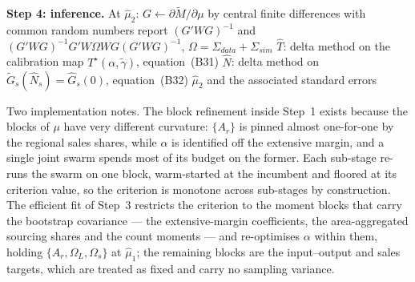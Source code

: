 \begin{algorithm}[H]
\begin{algorithmic}[1]
\vspace{3pt}
\State \textbf{Step 4: inference.} At $\widehat{\mu}_2$:
\State \quad $G\gets\partial\widetilde{M}/\partial\mu$ by central finite
  differences with common random numbers
\State \quad report $(G'WG)^{-1}$ and
  $(G'WG)^{-1}G'W\Omega WG(G'WG)^{-1}$, $\Omega=\Sigma_{data}+\Sigma_{sim}$
\State \quad $\widehat{T}$: delta method on the calibration map
  $T^\star(\alpha,\widetilde{\gamma})$, equation~(B31)
\State \quad $\widehat{N}$: delta method on
  $\widetilde{G}_s(\widehat{N}_s)=\widehat{G}_s(0)$, equation~(B32)
\State \Return $\widehat{\mu}_2$ and the associated standard errors
\end{algorithmic}
\end{algorithm}

Two implementation notes. The block refinement inside Step~1 exists because the
blocks of $\mu$ have very different curvature: $\{A_r\}$ is pinned almost
one-for-one by the regional sales shares, while $\alpha$ is identified off the
extensive margin, and a single joint swarm spends most of its budget on the
former. Each sub-stage re-runs the swarm on one block, warm-started at the
incumbent and floored at its criterion value, so the criterion is monotone
across sub-stages by construction. The efficient fit of Step~3 restricts the
criterion to the moment blocks that carry the bootstrap covariance --- the
extensive-margin coefficients, the area-aggregated sourcing shares and the
count moments --- and re-optimises $\alpha$ within them, holding
$\{A_r,\Omega_L,\Omega_s\}$ at $\widehat{\mu}_1$; the remaining blocks are the
input--output and sales targets, which are treated as fixed and carry no
sampling variance.
